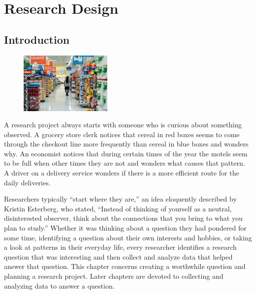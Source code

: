 \chapter{Research Design}\label{04:design}

\section{Introduction}

\begin{figure}
	\label{02:fig01} 
	\centering
	\includegraphics[width=0.4\textwidth]{gfx/04-store} 
\end{figure}
A research project always starts with someone who is curious about something observed. A grocery store clerk notices that cereal in red boxes seems to come through the checkout line more frequently than cereal in blue boxes and wonders why. An economist notices that during certain times of the year the motels seem to be full when other times they are not and wonders what causes that pattern. A driver on a delivery service wonders if there is a more efficient route for the daily deliveries.

Researchers typically ``start where they are,'' an idea eloquently described by Kristin Esterberg\cite{esterberg2002qualitative}, who stated, ``Instead of thinking of yourself as a neutral, disinterested observer, think about the connections that you bring to what you plan to study.'' Whether it was thinking about a question they had pondered for some time, identifying a question about their own interests and hobbies, or taking a look at patterns in their everyday life, every researcher identifies a research question that was interesting and then collect and analyze data that helped answer that question. This chapter concerns creating a worthwhile question and planning a research project. Later chapters are devoted to collecting and analyzing data to answer a question.

